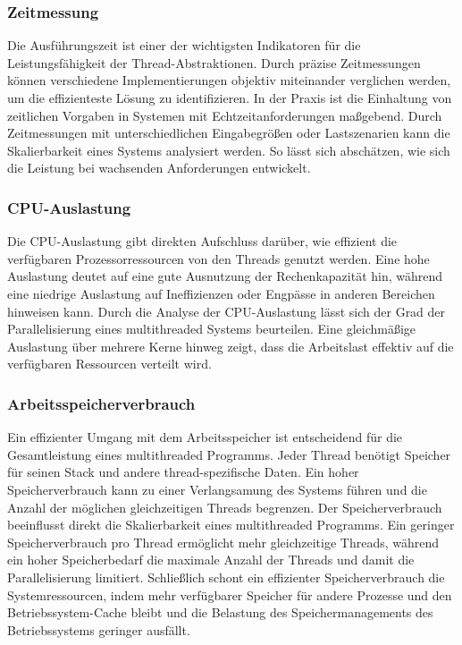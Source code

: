 \documentclass[fontsize=12pt,paper=a4,twoside=semi,parskip=half-,headsepline,headinclude]{scrreprt}
\begin{document}
\subsubsection{Zeitmessung}

Die Ausführungszeit ist einer der wichtigsten Indikatoren für die Leistungsfähigkeit der Thread-Abstraktionen. Durch präzise Zeitmessungen können verschiedene Implementierungen objektiv miteinander verglichen werden, um die effizienteste Lösung zu identifizieren. In der Praxis ist die Einhaltung von zeitlichen Vorgaben in Systemen mit Echtzeitanforderungen maßgebend. Durch Zeitmessungen mit unterschiedlichen Eingabegrößen oder Lastszenarien kann die Skalierbarkeit eines Systems analysiert werden. So lässt sich abschätzen, wie sich die Leistung bei wachsenden Anforderungen entwickelt.

\subsubsection{CPU-Auslastung}

Die CPU-Auslastung gibt direkten Aufschluss darüber, wie effizient die verfügbaren Prozessorressourcen von den Threads genutzt werden. Eine hohe Auslastung deutet auf eine gute Ausnutzung der Rechenkapazität hin, während eine niedrige Auslastung auf Ineffizienzen oder Engpässe in anderen Bereichen hinweisen kann. Durch die Analyse der CPU-Auslastung lässt sich der Grad der Parallelisierung eines multithreaded Systems beurteilen. Eine gleichmäßige Auslastung über mehrere Kerne hinweg zeigt, dass die Arbeitslast effektiv auf die verfügbaren Ressourcen verteilt wird.

\subsubsection{Arbeitsspeicherverbrauch}

Ein effizienter Umgang mit dem Arbeitsspeicher ist entscheidend für die Gesamtleistung eines multithreaded Programms. Jeder Thread benötigt Speicher für seinen Stack und andere thread-spezifische Daten. Ein hoher Speicherverbrauch kann zu einer Verlangsamung des Systems führen und die Anzahl der möglichen gleichzeitigen Threads begrenzen. Der Speicherverbrauch beeinflusst direkt die Skalierbarkeit eines multithreaded Programms. Ein geringer Speicherverbrauch pro Thread ermöglicht mehr gleichzeitige Threads, während ein hoher Speicherbedarf die maximale Anzahl der Threads und damit die Parallelisierung limitiert. Schließlich schont ein effizienter Speicherverbrauch die Systemressourcen, indem mehr verfügbarer Speicher für andere Prozesse und den Betriebssystem-Cache bleibt und die Belastung des Speichermanagements des Betriebssystems geringer ausfällt.
\end{document}
